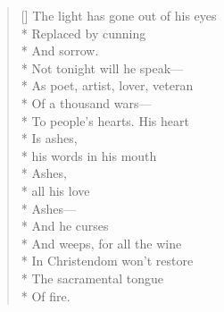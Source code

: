 \label{ch:drunk_poet}
\settowidth{\versewidth}{The light has gone out of his eyes}
\begin{verse}[\versewidth]
The light has gone out of his eyes\\*
Replaced by cunning\\*
And sorrow.\\*
Not tonight will he speak---\\*
As poet, artist, lover, veteran\\*
Of a thousand wars---\\*
To people's hearts.   His heart\\*
Is ashes,\\*
\qquad \qquad his words in his mouth\\*
Ashes, \\*
\qquad \quad all his love\\*
Ashes---\\*
\qquad \quad And he curses\\*
And weeps, for all the wine\\*
In Christendom won't restore\\*
The sacramental tongue\\*
Of fire.
\end{verse}
